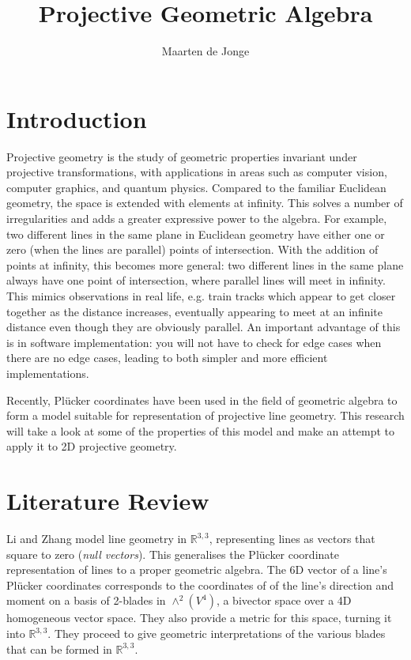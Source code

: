 \documentclass[a4paper, 10pt]{article}
\author{Maarten de Jonge}
\title{Projective Geometric Algebra}
\begin{document}
\newcommand{\rp}{$\mathbb{R}^{3,3}$ }

\maketitle

\section{Introduction}
Projective geometry is the study of geometric properties invariant under
projective transformations, with applications in areas such as computer vision,
computer graphics, and quantum physics. Compared to the familiar Euclidean
geometry, the space is extended with elements at infinity. This solves a number
of irregularities and adds a greater expressive power to the algebra. For
example, two different lines in the same plane in Euclidean geometry have either
one or zero (when the lines are parallel) points of intersection. With the
addition of points at infinity, this becomes more general: two different lines
in the same plane always have one point of intersection, where parallel lines
will meet in infinity. This mimics observations in real life, e.g. train tracks
which appear to get closer together as the distance increases, eventually
appearing to meet at an infinite distance even though they are obviously parallel.
An important advantage of this is in software implementation: you will not have
to check for edge cases when there are no edge cases, leading to both simpler
and more efficient implementations.

Recently, Pl\"{u}cker coordinates have been used in the field of geometric
algebra to form a model suitable for representation of projective line
geometry. This research will take a look at some of the properties of this
model and make an attempt to apply it to 2D projective geometry.

\section{Literature Review}
Li and Zhang\cite{hangbo2011} model line geometry in $\mathbb{R}^{3,3}$,
representing lines as vectors that square to zero (\emph{null vectors}). This
generalises the Pl\"{u}cker coordinate representation of lines to a proper
geometric algebra. The 6D vector of a line's Pl\"{u}cker coordinates corresponds
to the coordinates of of the line's direction and moment on a basis of 2-blades
in $\wedge^2(V^4)$, a bivector space over a 4D homogeneous vector space. They
also provide a metric for this space, turning it into $\mathbb{R}^{3, 3}$.
They proceed to give geometric interpretations of the various blades that can
be formed in $\mathbb{R}^{3, 3}$.
\end{document}
